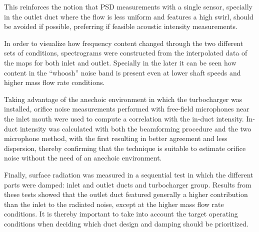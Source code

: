 This reinforces the notion that PSD measurements with a single sensor, specially in the outlet duct where the flow is less uniform and features a high swirl, should be avoided if possible, preferring if feasible acoustic intensity measurements.

In order to visualize how frequency content changed through the two different sets of conditions, spectrograms were constructed from the interpolated data of the maps for both inlet and outlet. Specially in the later it can be seen how content in the ``whoosh'' noise band is present even at lower shaft speeds and higher mass flow rate conditions. 

Taking advantage of the anechoic environment in which the turbocharger was installed, orifice noise measurements performed with free-field microphones near the inlet mouth were used to compute a correlation with the in-duct intensity. In-duct intensity was calculated with both the beamforming procedure and the two microphone method, with the first resulting in better agreement and less dispersion, thereby confirming that the technique is suitable to estimate orifice noise without the need of an anechoic environment.

Finally, surface radiation was measured in a sequential test in which the different parts were damped: inlet and outlet ducts and turbocharger group. Results from these tests showed that the outlet duct featured generally a higher contribution than the inlet to the radiated noise, except at the higher mass flow rate conditions. It is thereby important to take into account the target operating conditions when deciding which duct design and damping should be prioritized.